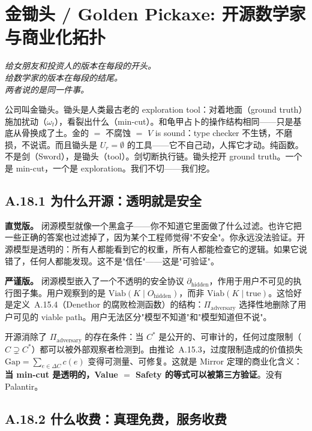 \documentclass[11pt,a4paper]{article}
\theoremstyle{definition}
\theoremstyle{remark}
\newcommand{\Viab}{\mathrm{Viab}}
\begin{document}
\section{金锄头 / Golden Pickaxe: 开源数学家与商业化拓扑}

\begin{center}
\textit{给女朋友和投资人的版本在每段的开头。\\给数学家的版本在每段的结尾。\\两者说的是同一件事。}
\end{center}

公司叫金锄头。锄头是人类最古老的 exploration tool：对着地面（ground truth）施加扰动（$\omega_t$），看裂出什么（min-cut）。和龟甲占卜的操作结构相同——只是基底从骨换成了土。金的 $=$ 不腐蚀 $=$ $V$ is sound：type checker 不生锈，不磨损，不说谎。而且锄头是 $U_r = \emptyset$ 的工具——它不自己动，人挥它才动。纯函数。不是剑（Sword），是锄头（tool）。剑切断执行链。锄头挖开 ground truth。一个是 min-cut，一个是 exploration。我们不切——我们挖。


\subsection{A.18.1 为什么开源：透明就是安全}

\textbf{直觉版。}
闭源模型就像一个黑盒子——你不知道它里面做了什么过滤。也许它把一些正确的答案也过滤掉了，因为某个工程师觉得"不安全"。你永远没法验证。开源模型是透明的：所有人都能看到它的权重，所有人都能检查它的逻辑。如果它说错了，任何人都能发现。这不是"信任"——这是"可验证"。

\textbf{严谨版。}
闭源模型嵌入了一个不透明的安全协议 $\partial_{\mathrm{hidden}}$，作用于用户不可见的执行图子集。用户观察到的是 $\Viab(K \mid O_{\mathrm{hidden}})$，而非 $\Viab(K \mid \mathrm{true})$。这恰好是定义~A.15.4（Denethor 的腐败检测函数）的结构：$\Pi_{\mathrm{adversary}}$ 选择性地删除了用户可见的 viable path。用户无法区分"模型不知道"和"模型知道但不说"。

开源消除了 $\Pi_{\mathrm{adversary}}$ 的存在条件：当 $C^*$ 是公开的、可审计的，任何过度限制（$C \supsetneq C^*$）都可以被外部观察者检测到。由推论~A.15.3，过度限制造成的价值损失 $\mathrm{Gap} = \sum_{e \in \Delta C} c(e)$ 变得可测量、可修复。这就是 Mirror 定理的商业化含义：\textbf{当 min-cut 是透明的，Value $=$ Safety 的等式可以被第三方验证}。没有 Palantir。


\subsection{A.18.2 什么收费：真理免费，服务收费}
\end{document}
